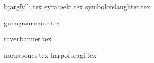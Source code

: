 
\raggedcolumns
\begin{multicols}{2}

\subtitle{\weaponenchantments}
\startsortedpricelist

{bjargfylli.tex}
{eyratoeki.tex}
{symbolofslaughter.tex}

\endsortedpricelist


\subtitle{\armourenchantments}
\startsortedpricelist

{gunagrsarmour.tex}

\endsortedpricelist


\subtitle{\bannerenchantments}
\startsortedpricelist

{ravenbanner.tex}

\endsortedpricelist


\subtitle{\artefacts}
\startsortedpricelist

{nornsbones.tex}
{harpofbragi.tex}

\endsortedpricelist
\end{multicols}

